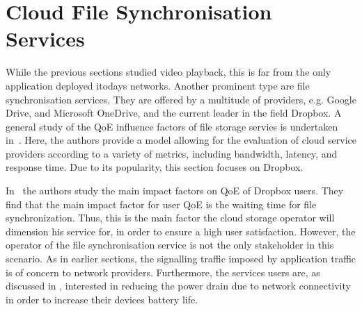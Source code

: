 \section{Cloud File Synchronisation Services}\label{sec:application:cloud_file_synchronisation}

\newcommand{\dropbox}{\emph{DropBox}\xspace}
\newcommand{\imageFileSize}{\ensuremath{S_I}\xspace}
\newcommand{\imageArrivalRate}{\ensuremath{\lambda_I}\xspace}
\newcommand{\panTransferRate}{\ensuremath{B_{P}}\xspace}
\newcommand{\interarrivaltime}{\ensuremath{t_I}\xspace}
\newcommand{\clientpreparationtime}{\ensuremath{C}\xspace}
\newcommand{\uploadbandwidth}{\ensuremath{B_U}\xspace}
\newcommand{\idleThreshold}{\ensuremath{\tau}\xspace}
\newcommand{\serverpreparationtime}{\ensuremath{S}\xspace}
\newcommand{\downloadbandwidth}{\ensuremath{B_D}\xspace}
\newcommand{\startupDelay}{\ensuremath{\sigma}\xspace}
\newcommand{\sojournTime}{\ensuremath{\Sigma}\xspace}
\newcommand{\relativeDisconnectedTime}{\ensuremath{\Delta}\xspace}
\newcommand{\connectionCount}{\ensuremath{K}\xspace}
\newcommand{\algointerval}{\emph{Interval}\xspace}
\newcommand{\algosize}{\emph{Size}\xspace}
\newcommand{\algoimmediate}{\emph{Immediate}\xspace}
\newcommand{\numberOfFiles}{\ensuremath{n}}

While the previous sections studied video playback, this is far from the only application deployed itodays networks.
Another prominent type are file synchronisation services.
They are offered by a multitude of providers, e.g. Google Drive, and Microsoft OneDrive, and the current leader in the field Dropbox.
A general study of the \gls{QoE} influence factors of file storage servies is undertaken in~\cite{Qian2011b}.
Here, the authors provide a model allowing for the evaluation of cloud service providers according to a variety of metrics, including bandwidth, latency, and response time.
Due to its popularity, this section focuses on Dropbox.

In~\cite{Amrehm2013} the authors study the main impact factors on \gls{QoE} of Dropbox users.
They find that the main impact factor for user \gls{QoE} is the waiting time for file synchronization.
Thus, this is the main factor the cloud storage operator will dimension his service for, in order to ensure a high user satisfaction. 
However, the operator of the file synchronisation service is not the only stakeholder in this scenario.
As in earlier sections, the signalling traffic imposed by application traffic is of concern to network providers.
Furthermore, the services users are, as discussed in , interested in reducing the power drain due to network connectivity in order to increase their devices battery life.


